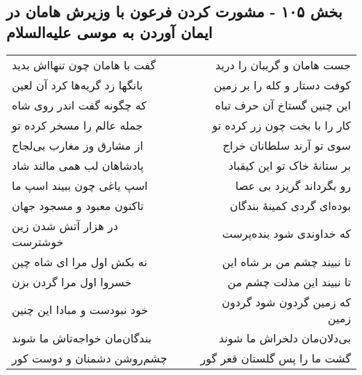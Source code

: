 \begin{center}
\section*{بخش ۱۰۵ - مشورت کردن فرعون با وزیرش هامان در ایمان آوردن به موسی علیه‌السلام}
\label{sec:sh105}
\begin{longtable}{l p{0.5cm} r}
گفت با هامان چون تنهااش بدید
&&
جست هامان و گریبان را درید
\\
بانگها زد گریه‌ها کرد آن لعین
&&
کوفت دستار و کله را بر زمین
\\
که چگونه گفت اندر روی شاه
&&
این چنین گستاخ آن حرف تباه
\\
جمله عالم را مسخر کرده تو
&&
کار را با بخت چون زر کرده تو
\\
از مشارق وز مغارب بی‌لجاج
&&
سوی تو آرند سلطانان خراج
\\
پادشاهان لب همی مالند شاد
&&
بر ستانهٔ خاک تو این کیقباد
\\
اسپ یاغی چون ببیند اسپ ما
&&
رو بگرداند گریزد بی عصا
\\
تاکنون معبود و مسجود جهان
&&
بوده‌ای گردی کمینهٔ بندگان
\\
در هزار آتش شدن زین خوشترست
&&
که خداوندی شود بنده‌پرست
\\
نه بکش اول مرا ای شاه چین
&&
تا نبیند چشم من بر شاه این
\\
خسروا اول مرا گردن بزن
&&
تا نبیند این مذلت چشم من
\\
خود نبودست و مبادا این چنین
&&
که زمین گردون شود گردون زمین
\\
بندگان‌مان خواجه‌تاش ما شوند
&&
بی‌دلان‌مان دلخراش ما شوند
\\
چشم‌روشن دشمنان و دوست کور
&&
گشت ما را پس گلستان قعر گور
\\
\end{longtable}
\end{center}
